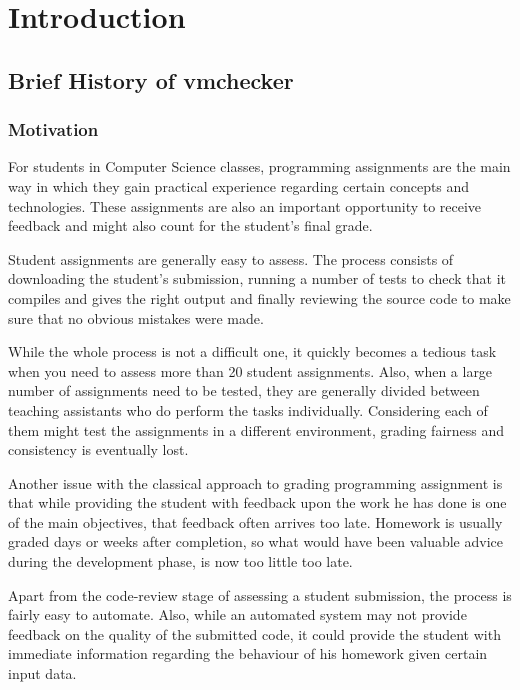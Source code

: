 \chapter{Introduction}
\label{chapter:intro}

\section{Brief History of vmchecker}
\label{sec:vmc-history}

\subsection{Motivation}
\label{sub-sec:vmc-history-motiv}

For students in Computer Science classes, programming assignments are the main
way in which they gain practical experience regarding certain concepts and 
technologies. These assignments are also an important opportunity to receive 
feedback and might also count for the student's final grade.

Student assignments are generally easy to assess. The process consists of 
downloading the student's submission, running a number of tests to check that 
it compiles and gives the right output and finally reviewing the source code
to make sure that no obvious mistakes were made.

While the whole process is not a difficult one, it quickly becomes a tedious task
when you need to assess more than 20 student assignments. Also, when a large number
of assignments need to be tested, they are generally divided between teaching 
assistants who do perform the tasks individually. Considering each of them might
test the assignments in a different environment, grading fairness and consistency
is eventually lost.

Another issue with the classical approach to grading programming assignment is that
while providing the student with feedback upon the work he has done is one of the
main objectives, that feedback often arrives too late. Homework is usually graded
days or weeks after completion, so what would have been valuable advice during the
development phase, is now too little too late.

Apart from the code-review stage of assessing a student submission, the process is 
fairly easy to automate. Also, while an automated system may not provide feedback 
on the quality of the submitted code, it could provide the student with immediate
information regarding the behaviour of his homework given certain input data.

